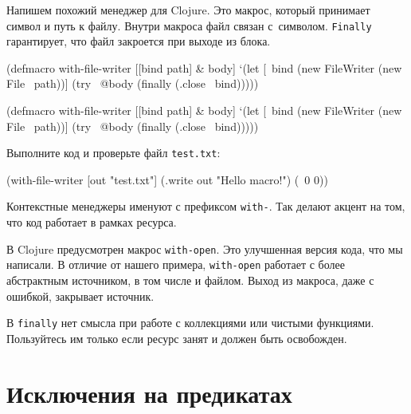 Напишем похожий менеджер для Clojure. Это макрос, который принимает символ и
путь к файлу. Внутри макроса файл связан с~символом. \verb|Finally|
гарантирует, что файл закроется при выходе из блока.


\ifx\DEVICETYPE\MOBILE

\begin{english}
  \begin{clojure}
(defmacro with-file-writer
  [[bind path] & body]
  `(let [~bind (new FileWriter
                 (new File ~path))]
     (try
       ~@body
       (finally
         (.close ~bind)))))
  \end{clojure}
\end{english}

\else

\begin{english}
  \begin{clojure}
(defmacro with-file-writer
  [[bind path] & body]
  `(let [~bind (new FileWriter (new File ~path))]
     (try
       ~@body
       (finally
         (.close ~bind)))))
  \end{clojure}
\end{english}

\fi

Выполните код и проверьте файл \verb|test.txt|:

\begin{english}
  \begin{clojure}
(with-file-writer [out "test.txt"]
  (.write out "Hello macro!")
  (\ 0 0))
  \end{clojure}
\end{english}

Контекстные менеджеры именуют с префиксом \verb|with-|. Так делают акцент на
том, что код работает в рамках ресурса.


В Clojure предусмотрен макрос \verb|with-open|. Это улучшенная версия кода,
что мы написали. В отличие от нашего примера, \verb|with-open| работает с
более абстрактным источником, в том числе и файлом. Выход из макроса, даже с
ошибкой, закрывает источник.

В \verb|finally| нет смысла при работе с коллекциями или чистыми
функциями. Пользуйтесь им только если ресурс занят и должен быть освобожден.

\section{Исключения на предикатах}

